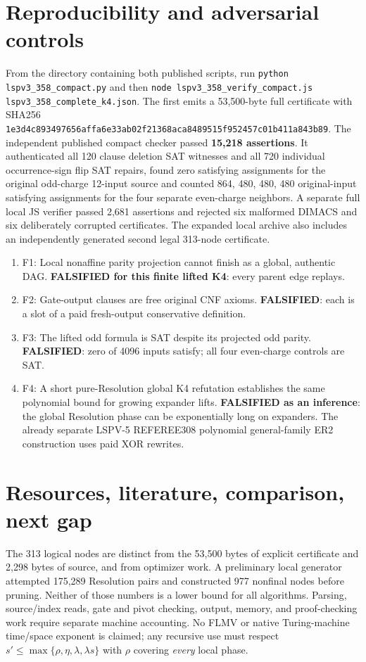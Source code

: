 \documentclass[11pt]{article}
\begin{document}
\section*{Reproducibility and adversarial controls}
From the directory containing both published scripts, run \texttt{python lspv3\_358\_compact.py} and then \texttt{node lspv3\_358\_verify\_compact.js lspv3\_358\_complete\_k4.json}. The first emits a 53,500-byte full certificate with SHA256 \texttt{1e3d4c893497656affa6e33ab02f21368aca8489515f952457c01b411a843b89}. The independent published compact checker passed \textbf{15,218 assertions}. It authenticated all 120 clause deletion SAT witnesses and all 720 individual occurrence-sign flip SAT repairs, found zero satisfying assignments for the original odd-charge 12-input source and counted 864, 480, 480, 480 original-input satisfying assignments for the four separate even-charge neighbors. A separate full local JS verifier passed 2,681 assertions and rejected six malformed DIMACS and six deliberately corrupted certificates. The expanded local archive also includes an independently generated second legal 313-node certificate.

\begin{enumerate}
\item[] F1: Local nonaffine parity projection cannot finish as a global, authentic DAG. \textbf{FALSIFIED for this finite lifted K4}: every parent edge replays.
\item[] F2: Gate-output clauses are free original CNF axioms. \textbf{FALSIFIED}: each is a slot of a paid fresh-output conservative definition.
\item[] F3: The lifted odd formula is SAT despite its projected odd parity. \textbf{FALSIFIED}: zero of 4096 inputs satisfy; all four even-charge controls are SAT.
\item[] F4: A short pure-Resolution global K4 refutation establishes the same polynomial bound for growing expander lifts. \textbf{FALSIFIED as an inference}: the global Resolution phase can be exponentially long on expanders. The already separate LSPV-5 REFEREE308 polynomial general-family ER2 construction uses paid XOR rewrites.
\end{enumerate}

\section*{Resources, literature, comparison, next gap}
The 313 logical nodes are distinct from the 53,500 bytes of explicit certificate and 2,298 bytes of source, and from optimizer work. A preliminary local generator attempted 175,289 Resolution pairs and constructed 977 nonfinal nodes before pruning. Neither of those numbers is a lower bound for all algorithms. Parsing, source/index reads, gate and pivot checking, output, memory, and proof-checking work require separate machine accounting. No FLMV or native Turing-machine time/space exponent is claimed; any recursive use must respect $s'\le\max\{\rho,\eta,\lambda,\lambda s\}$ with $\rho$ covering \emph{every} local phase.
\end{document}
